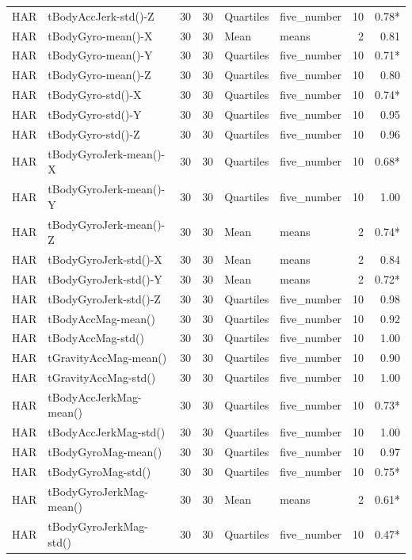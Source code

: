 \begin{longtable}{p{1.95cm}p{4.25cm}rrp{1.7cm}p{2.1cm}rr}
HAR & tBodyAccJerk-std()-Z & 30 & 30 & Quartiles & five\_number & 10 & 0.78*\\
HAR & tBodyGyro-mean()-X & 30 & 30 & Mean & means & 2 & 0.81\\
HAR & tBodyGyro-mean()-Y & 30 & 30 & Quartiles & five\_number & 10 & 0.71*\\
HAR & tBodyGyro-mean()-Z & 30 & 30 & Quartiles & five\_number & 10 & 0.80\\
HAR & tBodyGyro-std()-X & 30 & 30 & Quartiles & five\_number & 10 & 0.74*\\
HAR & tBodyGyro-std()-Y & 30 & 30 & Quartiles & five\_number & 10 & 0.95\\
HAR & tBodyGyro-std()-Z & 30 & 30 & Quartiles & five\_number & 10 & 0.96\\
HAR & tBodyGyroJerk-mean()-X & 30 & 30 & Quartiles & five\_number & 10 & 0.68*\\
HAR & tBodyGyroJerk-mean()-Y & 30 & 30 & Quartiles & five\_number & 10 & 1.00\\
HAR & tBodyGyroJerk-mean()-Z & 30 & 30 & Mean & means & 2 & 0.74*\\
HAR & tBodyGyroJerk-std()-X & 30 & 30 & Mean & means & 2 & 0.84\\
HAR & tBodyGyroJerk-std()-Y & 30 & 30 & Mean & means & 2 & 0.72*\\
HAR & tBodyGyroJerk-std()-Z & 30 & 30 & Quartiles & five\_number & 10 & 0.98\\
HAR & tBodyAccMag-mean() & 30 & 30 & Quartiles & five\_number & 10 & 0.92\\
HAR & tBodyAccMag-std() & 30 & 30 & Quartiles & five\_number & 10 & 1.00\\
HAR & tGravityAccMag-mean() & 30 & 30 & Quartiles & five\_number & 10 & 0.90\\
HAR & tGravityAccMag-std() & 30 & 30 & Quartiles & five\_number & 10 & 1.00\\
HAR & tBodyAccJerkMag-mean() & 30 & 30 & Quartiles & five\_number & 10 & 0.73*\\
HAR & tBodyAccJerkMag-std() & 30 & 30 & Quartiles & five\_number & 10 & 1.00\\
HAR & tBodyGyroMag-mean() & 30 & 30 & Quartiles & five\_number & 10 & 0.97\\
HAR & tBodyGyroMag-std() & 30 & 30 & Quartiles & five\_number & 10 & 0.75*\\
HAR & tBodyGyroJerkMag-mean() & 30 & 30 & Mean & means & 2 & 0.61*\\
HAR & tBodyGyroJerkMag-std() & 30 & 30 & Quartiles & five\_number & 10 & 0.47*\\

\end{longtable}
